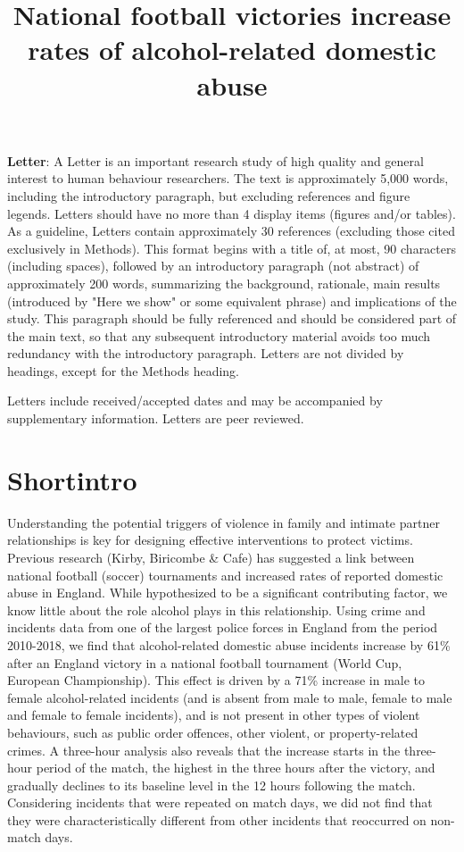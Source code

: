 \documentclass[12pt, letterpaper]{article}
\begin{document}
\title{National football victories increase rates of alcohol-related domestic abuse}
\textbf{Letter}:
A Letter is an important research study of high quality and general interest to human behaviour researchers.  The text is approximately 5,000 words, including the introductory paragraph, but excluding references and figure legends. Letters should have no more than 4 display items (figures and/or tables). As a guideline, Letters contain approximately 30 references (excluding those cited exclusively in Methods). This format begins with a title of, at most, 90 characters (including spaces), followed by an introductory paragraph (not abstract) of approximately 200 words, summarizing the background, rationale, main results (introduced by "Here we show" or some equivalent phrase) and implications of the study. This paragraph should be fully referenced and should be considered part of the main text, so that any subsequent introductory material avoids too much redundancy with the introductory paragraph. Letters are not divided by headings, except for the Methods heading.

Letters include received/accepted dates and may be accompanied by supplementary information. Letters are peer reviewed.


\maketitle

\section{Shortintro}

Understanding the potential triggers of violence in family and intimate partner relationships is key for designing effective interventions to protect victims. Previous research (Kirby, Biricombe \& Cafe) has suggested a link between national football (soccer) tournaments and increased rates of reported domestic abuse in England. While hypothesized to be a significant contributing factor, we know little about the role alcohol plays in this relationship. Using crime and incidents data from one of the largest police forces in England from the period 2010-2018, we find that alcohol-related domestic abuse incidents increase by 61\% after an England victory in a national football tournament (World Cup, European Championship). This effect is driven by a 71\% increase in male to female alcohol-related incidents (and is absent from male to male, female to male and female to female incidents), and is not present in other types of violent behaviours, such as public order offences, other violent, or property-related crimes. A three-hour analysis also reveals that the increase starts in the three-hour period of the match, the highest in the three hours after the victory, and gradually declines to its baseline level in the 12 hours following the match. Considering incidents that were repeated on match days, we did not find that they were characteristically different from other incidents that reoccurred on non-match days.
\end{document}
